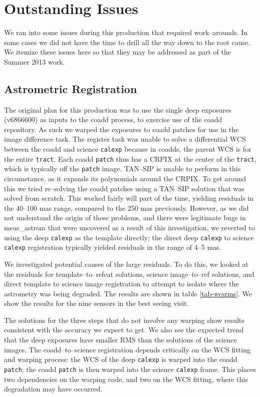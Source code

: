 \documentclass[prd, nofootinbib, floatfix, 11pt,tightenlines,times]{article}
\begin{document}
\section{Outstanding Issues}
We ran into some issues during this production that required work--arounds.  
In some cases we did not have the time to drill all the way down
to the root cause.  We itemize these issues here so that they may be addressed 
as part of the Summer 2013 work.


\subsection{Astrometric Registration \label{subsec-astrom}}
The original plan for this production was to use the single deep exposures (v6866600) as 
inputs to the coadd process, to exercise use of the coadd repository.  As 
such we warped the exposures to coadd patches for use in the image difference
task.  The register task was unable to solve a differential WCS between the coadd
and science {\tt calexp} because in coadds, the parent WCS is for the entire {\tt tract}.
Each coadd {\tt patch} thus has a CRPIX at the center of the {\tt tract}, which is
typically off the {\tt patch} image.  TAN--SIP is unable to perform in this circumstance,
as it expands its polynomials around the CRPIX.  To get around this 
we tried re--solving the coadd patches using a TAN--SIP solution that was solved from
scratch.  This worked fairly will part of the time,
yielding residuals in the 40--100 mas range, compared to the 250 mas previously.  However,
as we did not understand the origin of these problems, and there were legitimate bugs
in meas\_astrom  that were uncovered as a result of this investigation, we reverted to
using the deep {\tt calexp} as the template directly; the direct deep {\tt calexp} to science {\tt calexp} 
registration typically yielded residuals in the range of 4--5 mas.

We investigated potential causes of the large residuals.  To do this, we looked at the 
residuals for template--to--refcat solutions, science image--to--ref solutions, and 
direct template to science image registration to attempt to isolate where the astrometry 
was being degraded.  The results are shown
in table \ref{tab-wcsrms}.  We show the results for the nine sensors in the best seeing visit.  

The solutions for the three steps that do not involve any warping show results consistent with 
the accuracy we expect to get.  We also see the expected trend that the deep exposures have 
smaller RMS than the solutions of the science images.  The coadd--to--science registration
depends critically on the WCS fitting and warping process: the WCS of the deep {\tt calexp} is warped
into the coadd {\tt patch}; the coadd {\tt patch} is then warped into the science {\tt calexp} frame.
This places two dependencies on the warping code, and two on the WCS fitting, where
this degradation may have occurred.
\end{document}

